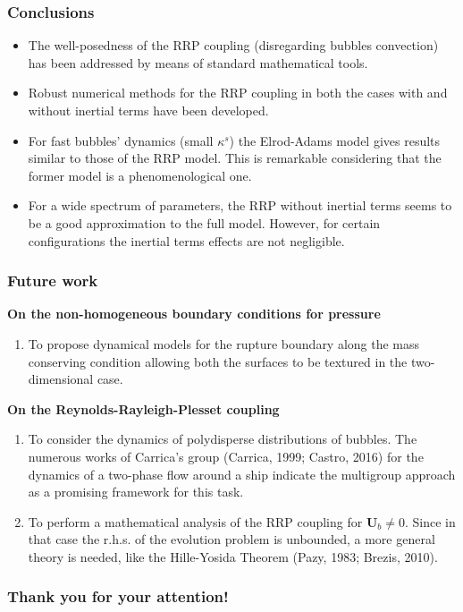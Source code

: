 \documentclass[10pt,aspectratio=169]{beamer}
\begin{document}
\begin{frame}
\frametitle{Conclusions}
\begin{itemize}
	\item The well-posedness of the RRP coupling (disregarding bubbles convection) has been addressed by means of standard mathematical tools.
	\item Robust numerical methods for the RRP coupling in both the cases with and without inertial terms have been developed.
	
	\item For fast bubbles' dynamics (small $\kappa^s$) the Elrod-Adams model gives results similar to those of the RRP model. This is remarkable considering that the former model is a phenomenological one.
	
	\item For a wide spectrum of parameters, the RRP without inertial terms seems to be a good approximation to the full model. However, for certain configurations the inertial terms effects are not negligible.
\end{itemize}
\end{frame}  

\begin{frame}
\frametitle{Future work}
\vspace*{0.5cm}
\noindent\textbf{On the non-homogeneous boundary conditions for pressure}
\begin{enumerate}
	\item To propose dynamical models for the rupture boundary along the mass conserving condition allowing both the surfaces to be textured in the two-dimensional case.
\end{enumerate}

\noindent\textbf{On the Reynolds-Rayleigh-Plesset coupling}
\begin{enumerate}
	\item To consider the dynamics of polydisperse distributions of bubbles. The numerous works of Carrica's group (Carrica, 1999; Castro, 2016) for the dynamics of a two-phase flow around a ship indicate the multigroup approach as a promising framework for this task.%
	
	\item To perform a mathematical analysis of the RRP coupling for $\mathbf{U}_b\neq 0$. Since in that case the r.h.s. of the evolution problem is unbounded, a more general theory is needed, like the Hille-Yosida Theorem (Pazy, 1983; Brezis, 2010).
\end{enumerate}
\end{frame}  


\setcounter{showSlideNumbers}{0}
\begin{frame}[noframenumbering]
\frametitle{Thank you for your attention!}\centering


\end{frame}
\end{document}
